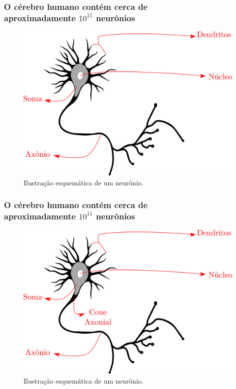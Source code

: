\documentclass[10pt]{beamer} %
\begin{document}
\begin{frame}
	\frametitle{O cérebro humano contém cerca de \\ aproximadamente $10^{11}$   neurônios}
	\begin{figure}
		\centering
		\includegraphics[scale=0.2]{Imagens/axonio.png} 
		\caption{Ilustração esquemática de um neurônio.}
	\end{figure}
\end{frame}

\begin{frame}
	\frametitle{O cérebro humano contém cerca de \\ aproximadamente $10^{11}$   neurônios}
	\begin{figure}
		\centering
		\includegraphics[scale=0.2]{Imagens/cone.png} 
		\caption{Ilustração esquemática de um neurônio.}
	\end{figure}
\end{frame}
\end{document}
